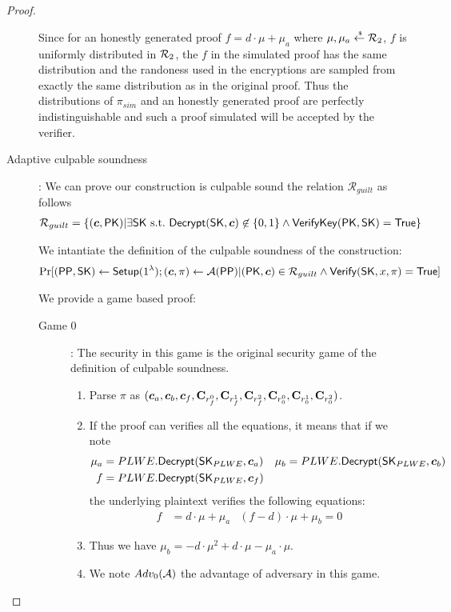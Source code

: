 \begin{proof}
\begin{description}
    Since for an honestly generated proof $f = d \cdot \mu + \mu_a$ where $\mu, \mu_a \stackrel{{\scriptscriptstyle \mkern4mu \$}}{\gets} {\mathcal{R}}_2$, $f$ is uniformly distributed in ${\mathcal{R}}_2$,
    the $f$ in the simulated proof has the same distribution and the randoness used in the encryptions are sampled from exactly the same distribution as in the original proof.
    Thus the distributions of $\pi_{sim}$ and an honestly generated proof are perfectly indistinguishable and such a proof simulated will be accepted by the verifier.
    
  \item[\textsf{Adaptive culpable soundness}]:
    We can prove our construction is culpable sound \wrt the relation $\mathcal{R}_{guilt}$ as follows
    \begin{align*}
      \mathcal{R}_{guilt} &= \{(\vec{c}, \PK) | \exists \SK~\st~\Dec(\SK, \vec{c}) \not \in \{0,1\}  \wedge {\mathsf{VerifyKey}}(\PK, \SK)  = \True\}
    \end{align*}

    We intantiate the definition of the culpable soundness of the construction:
    \begin{align*}
      \Pr[(\PPP, \SK) \gets \Setup(1^{\lambda}); (\vec{c}, \pi) \gets \Adv(\PPP) | (\PK, \vec{c}) \in \mathcal{R}_{guilt} \wedge \Verif(\SK, x, \pi) = \True]
    \end{align*}

    We provide a game based proof:
    \begin{description}
    \item[\textsf{Game} $0$]: The security in this game is the original security game of the definition of culpable soundness.
      \begin{enumerate}
      \item Parse $\pi$ as $(\vec{c}_a, \vec{c}_b, \vec{c}_f, \mat{C}_{r_f^0}, \mat{C}_{r_f^1}, \mat{C}_{r_f^2}, \mat{C}_{r_0^0}, \mat{C}_{r_0^1}, \mat{C}_{r_0^2})$.
      \item If the proof can verifies all the equations, it means that if we note
        \begin{align*}
          \mu_a &= PLWE.\Dec(\SK_{PLWE}, \vec{c}_a) & \mu_b &= PLWE.\Dec(\SK_{PLWE}, \vec{c}_b) \\
          f &= PLWE.\Dec(\SK_{PLWE}, \vec{c}_f)
        \end{align*}
        the underlying plaintext verifies the following equations:
        \begin{align*}
          f &= d \cdot \mu + \mu_a & (f - d) \cdot \mu + \mu_b = 0
        \end{align*}
      \item Thus we have $\mu_b = - d \cdot \mu^2 + d \cdot \mu - \mu_a \cdot \mu$.
      \item We note $Adv_0(\mathcal{A})$ the advantage of adversary in this game.
      \end{enumerate}


\end{description}
\end{description}
\end{proof}
